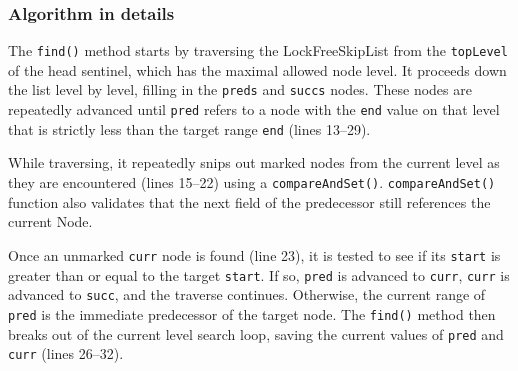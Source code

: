 \vspace{15pt}

\begin{figure}[h]
    \centering
    
\end{figure}

\subsubsection{Algorithm in details}
The \texttt{find()} method starts by traversing the LockFreeSkipList from the \texttt{topLevel} of the head sentinel, which has the maximal allowed node level.
It proceeds down the list level by level, filling in the \texttt{preds} and \texttt{succs} nodes.
These nodes are repeatedly advanced until \texttt{pred} refers to a node with the \texttt{end} value on that level that is strictly less than the target range \texttt{end} (lines 13--29).

While traversing, it repeatedly snips out marked nodes from the current level as they are encountered (lines 15--22) using a \texttt{compareAndSet()}.
\texttt{compareAndSet()} function also validates that the next field of the predecessor still references the current Node.

Once an unmarked \texttt{curr} node is found (line 23), it is tested to see if its \texttt{start} is greater than or equal to the target \texttt{start}.
If so, \texttt{pred} is advanced to \texttt{curr}, \texttt{curr} is advanced to \texttt{succ}, and the traverse continues.
Otherwise, the current range of \texttt{pred} is the immediate predecessor of the target node.
The \texttt{find()} method then breaks out of the current level search loop, saving the current values of \texttt{pred} and \texttt{curr} (lines 26--32).

